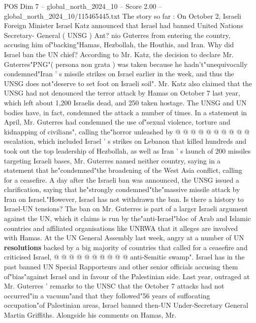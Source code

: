 \begin{textsample}{POS Dim 7 – global\_north\_2024\_10 – Score 2.00 – global\_north\_2024\_10/115465445.txt}  \label{ex:f7_pos_412}
The story so far : On October 2, Israeli Foreign Minister Israel Katz announced that Israel had banned United Nations Secretary- General ( UNSG ) Ant? nio Guterres from entering the country, accusing him of"backing"Hamas, Hezbollah, the Houthis, and Iran.
Why did Israel ban the UN chief?
According to Mr.
Katz, the decision to declare Mr.
Guterres"PNG"( persona non grata ) was taken because he hadn't"unequivocally condemned"Iran ' s missile strikes on Israel earlier in the week, and thus the UNSG does not"deserve to set foot on Israeli soil".
Mr.
Katz also claimed that the UNSG had not denounced the terror attack by Hamas on October 7 last year, which left about 1,200 Israelis dead, and 250 taken hostage.
The UNSG and UN bodies have, in fact, condemned the attack a number of times.
In a statement in April, Mr.
Guterres had condemned the use of"sexual violence, torture and kidnapping of civilians", calling the"horror unleashed by @ @ @ @ @ @ @ @ @ @ escalation, which included Israel ' s strikes on Lebanon that killed hundreds and took out the top leadership of Hezbollah, as well as Iran ' s launch of 200 missiles targeting Israeli bases, Mr.
Guterres named neither country, saying in a statement that he"condemned"the broadening of the West Asia conflict, calling for a ceasefire.
A day after the Israeli ban was announced, the UNSG issued a clarification, saying that he"strongly condemned"the"massive missile attack by Iran on Israel."However, Israel has not withdrawn the ban.
Is there a history to Israel-UN tensions?
The ban on Mr.
Guterres is part of a larger Israeli argument against the UN, which it claims is run by the"anti-Israel"bloc of Arab and Islamic countries and affiliated organisations like UNRWA that it alleges are involved with Hamas.
At the UN General Assembly last week, angry at a number of UN \textbf{resolutions} backed by a big majority of countries that called for a ceasefire and criticised Israel, @ @ @ @ @ @ @ @ @ @ anti-Semitic swamp".
Israel has in the past banned UN Special Rapporteurs and other senior officials accusing them of"bias"against Israel and in favour of the Palestinian side.
Last year, outraged at Mr.
Guterres ' remarks to the UNSC that the October 7 attacks had not occurred"in a vacuum"and that they followed"56 years of suffocating occupation"of Palestinian areas, Israel banned then-UN Under-Secretary General Martin Griffiths.
Alongside his comments on Hamas, Mr.

\end{textsample}
